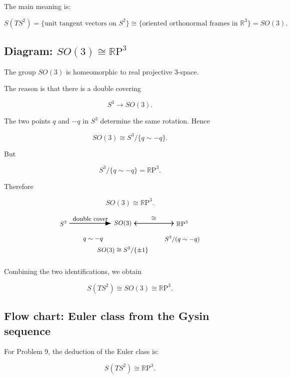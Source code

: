 \documentclass[12pt,a4paper]{article}
\newcommand{\RP}{\mathbb{R}\mathrm{P}}
\newcommand{\R}{\mathbb{R}}
\theoremstyle{notespace}
\begin{document}
	The main meaning is:
	
	\[
	\boxed{
		S(TS^{2})
		=
		\{\text{unit tangent vectors on }S^{2}\}
		\cong
		\{\text{oriented orthonormal frames in }\R^{3}\}
		=
		SO(3).
	}
	\]
	
	\subsection{Diagram: \(SO(3)\cong \RP^{3}\)}
	
	The group \(SO(3)\) is homeomorphic to real projective \(3\)-space.
	
	The reason is that there is a double covering
	
	\[
	S^{3}\to SO(3).
	\]
	
	The two points \(q\) and \(-q\) in \(S^{3}\) determine the same rotation. Hence
	
	\[
	SO(3)\cong S^{3}/\{q\sim -q\}.
	\]
	
	But
	
	\[
	S^{3}/\{q\sim -q\}=\RP^{3}.
	\]
	
	Therefore
	
	\[
	SO(3)\cong \RP^{3}.
	\]
	
	\[
	\begin{tikzpicture}[node distance=2.8cm, every node/.style={font=\small}]
		
		\node (S3) at (0,0) {\(S^{3}\)};
		\node (SO3) at (3,0) {\(SO(3)\)};
		\node (RP3) at (6,0) {\(\RP^{3}\)};
		
		\draw[-{Latex[length=3mm]}, thick] (S3) -- (SO3)
		node[midway, above] {double cover};
		\draw[<->, thick] (SO3) -- (RP3)
		node[midway, above] {\(\cong\)};
		
		\node at (1.5,-0.8) {\(q\sim -q\)};
		\node at (3,-1.35) {\(SO(3)\cong S^{3}/\{\pm1\}\)};
		\node at (6,-0.8) {\(S^{3}/(q\sim -q)\)};
		
	\end{tikzpicture}
	\]
	
	Combining the two identifications, we obtain
	
	\[
	\boxed{
		S(TS^{2})\cong SO(3)\cong \RP^{3}.
	}
	\]
	
	\subsection{Flow chart: Euler class from the Gysin sequence}
	
	For Problem 9, the deduction of the Euler class is:
	
	\[
	S(TS^{2})\cong \RP^{3}.
	\]
	
\end{document}
